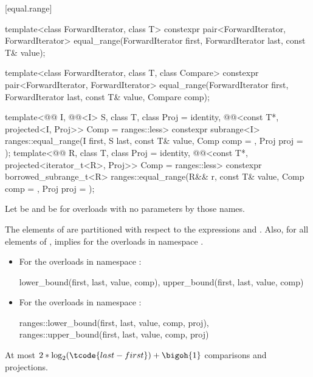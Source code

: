 [equal.range]{}

%
\begin{itemdecl}
template<class ForwardIterator, class T>
  constexpr pair<ForwardIterator, ForwardIterator>
    equal_range(ForwardIterator first,
                ForwardIterator last, const T& value);

template<class ForwardIterator, class T, class Compare>
  constexpr pair<ForwardIterator, ForwardIterator>
    equal_range(ForwardIterator first,
                ForwardIterator last, const T& value,
                Compare comp);

template<@@ I, @@<I> S, class T, class Proj = identity,
         @@<const T*, projected<I, Proj>> Comp = ranges::less>
  constexpr subrange<I>
    ranges::equal_range(I first, S last, const T& value, Comp comp = {}, Proj proj = {});
template<@@ R, class T, class Proj = identity,
         @@<const T*, projected<iterator_t<R>, Proj>> Comp =
           ranges::less>
  constexpr borrowed_subrange_t<R>
    ranges::equal_range(R&& r, const T& value, Comp comp = {}, Proj proj = {});
\end{itemdecl}

\begin{itemdescr}
\pnum
Let  be  and
 be 
for overloads with no parameters by those names.

\pnum
\expects
The elements  of 
are partitioned with respect to the expressions
 and
.
Also, for all elements  of ,
 implies 
for the overloads in namespace .

\pnum
\returns
\begin{itemize}
\item
For the overloads in namespace :
\begin{codeblock}
{lower_bound(first, last, value, comp),
 upper_bound(first, last, value, comp)}
\end{codeblock}
\item
For the overloads in namespace :
\begin{codeblock}
{ranges::lower_bound(first, last, value, comp, proj),
 ranges::upper_bound(first, last, value, comp, proj)}
\end{codeblock}
\end{itemize}

\pnum
\complexity
At most
$2 * \log_2(\tcode{last - first}) + \bigoh{1}$ comparisons and projections.
\end{itemdescr}

